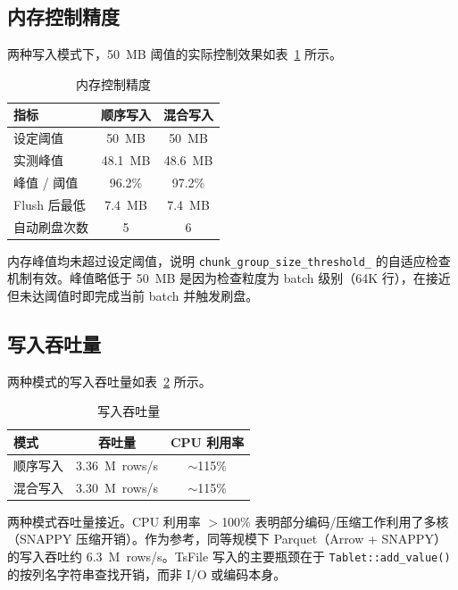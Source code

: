 \subsection{内存控制精度}

两种写入模式下，50~MB 阈值的实际控制效果如表~\ref{tab:mem-control-precision} 所示。

\begin{table}[htbp]
  \centering
  \caption{内存控制精度}
  \label{tab:mem-control-precision}
  \begin{tabular}{lcc}
    \toprule
    指标 & 顺序写入 & 混合写入 \\
    \midrule
    设定阈值 & 50~MB & 50~MB \\
    实测峰值 & 48.1~MB & 48.6~MB \\
    峰值 / 阈值 & 96.2\% & 97.2\% \\
    Flush 后最低 & 7.4~MB & 7.4~MB \\
    自动刷盘次数 & 5 & 6 \\
    \bottomrule
  \end{tabular}
\end{table}

内存峰值均未超过设定阈值，说明 \texttt{chunk\_group\_size\_threshold\_} 的自适应检查机制有效。峰值略低于 50~MB 是因为检查粒度为 batch 级别（64K 行），在接近但未达阈值时即完成当前 batch 并触发刷盘。

\subsection{写入吞吐量}

两种模式的写入吞吐量如表~\ref{tab:write-throughput} 所示。

\begin{table}[htbp]
  \centering
  \caption{写入吞吐量}
  \label{tab:write-throughput}
  \begin{tabular}{lcc}
    \toprule
    模式 & 吞吐量 & CPU 利用率 \\
    \midrule
    顺序写入 & 3.36~M~rows/s & $\sim$115\% \\
    混合写入 & 3.30~M~rows/s & $\sim$115\% \\
    \bottomrule
  \end{tabular}
\end{table}

两种模式吞吐量接近。CPU 利用率 $>$100\% 表明部分编码/压缩工作利用了多核（SNAPPY 压缩开销）。作为参考，同等规模下 Parquet（Arrow + SNAPPY）的写入吞吐约 6.3~M~rows/s。TsFile 写入的主要瓶颈在于 \texttt{Tablet::add\_value()} 的按列名字符串查找开销，而非 I/O 或编码本身。

